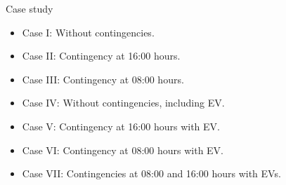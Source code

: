 \documentclass[10pt, aspectratio=1610]{beamer}
\begin{document}
                

\begin{frame}{Case study}
    \begin{itemize}
        \item Case I: Without contingencies.
        \item Case II: Contingency at 16:00 hours.
        \item Case III: Contingency at 08:00 hours. 
        \item Case IV: Without contingencies, including EV.
        \item Case V: Contingency at 16:00 hours with EV.
        \item Case VI: Contingency at 08:00 hours with  EV. 
        \item Case VII: Contingencies at 08:00 and 16:00 hours with EVs.
    \end{itemize}
\end{frame}
\end{document}
